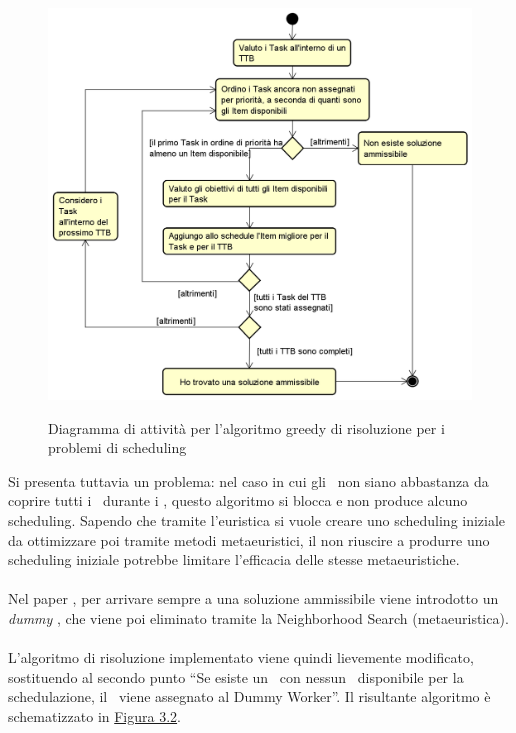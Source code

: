 \begin{figure}[!h]
    \begin{widepage}
        \label{fig31}
        \includegraphics[width=16cm,keepaspectratio]{../immagini/algoritmo.png}
        \caption{Diagramma di attività per l'algoritmo greedy di risoluzione per i problemi di scheduling}
    \end{widepage}
\end{figure}
\FloatBarrier
\noindent
Si presenta tuttavia un problema: nel caso in cui gli \items\ non siano abbastanza da coprire tutti i \task\ durante i \ttb, questo algoritmo si blocca e non produce alcuno scheduling. Sapendo che tramite l'euristica si vuole creare uno scheduling iniziale da ottimizzare poi tramite metodi metaeuristici, il non riuscire a produrre uno scheduling iniziale potrebbe limitare l'efficacia delle stesse metaeuristiche. \\
\\
Nel paper , per arrivare sempre a una soluzione ammissibile viene introdotto un \emph{\gls{dummy}}\glsfirstoccur
, che viene poi eliminato tramite la Neighborhood Search (metaeuristica). \\
\\
L'algoritmo di risoluzione implementato viene quindi lievemente modificato, sostituendo al secondo punto ``Se esiste un \task\ con nessun \items\ disponibile per la schedulazione, il \task\ viene assegnato al Dummy Worker''. Il risultante algoritmo è schematizzato in \hyperref[fig32]{Figura 3.2}.
